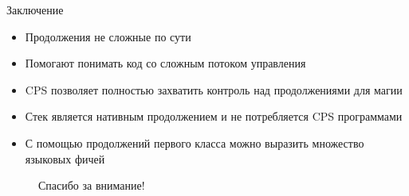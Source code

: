     \begin{frame}[fragile]{Заключение}
        \begin{itemize}
            \item Продолжения не сложные по сути
            \item Помогают понимать код со сложным потоком управления
            \item CPS позволяет полностью захватить контроль над продолжениями для магии
            \item Стек является нативным продолжением и не потребляется CPS программами
            \item С помощью продолжений первого класса можно выразить множество языковых фичей
        \end{itemize}
    \end{frame}

    \begin{frame}{}
        \begin{figure}
            \centering
            \LARGE
            \vspace{2em}
            Спасибо за внимание!
        \end{figure}
    \end{frame}


